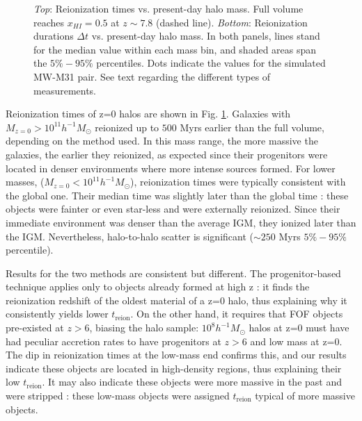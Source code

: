 \documentclass[twocolumn]{aastex61}
\begin{document}
\begin{figure}[ht]
\caption{\textit{Top}: Reionization times vs. present-day halo mass.
Full volume reaches $x_{HI}=0.5$ at $z\sim 7.8$ (dashed line). %
 \textit{Bottom}: Reionization durations $\Delta t$ vs. present-day halo mass. In both panels, lines stand for the median value within each mass bin, and shaded areas span the $5\%-95\%$ percentiles. Dots indicate the values for the simulated MW-M31 pair. See text regarding the different types of measurements.}
\label{fig:treion}
\end{figure}

Reionization times of z=0 halos are shown in Fig. \ref{fig:treion}. Galaxies with $M_{z=0}>10^{11} h^{-1}M_\odot$ reionized up to $500$ Myrs earlier than the full volume, depending on the method used. In this mass range, the more massive the galaxies, the earlier they reionized, as expected since their progenitors were located in denser environments where more intense sources formed. For lower masses, ($M_{z=0}<10^{11} h^{-1}M_\odot$), reionization times were typically consistent with the global one.  Their median time was slightly later than the global time : these objects were fainter or even star-less and were externally reionized. Since their immediate environment was denser than the average IGM, they ionized later than the IGM.  Nevertheless, halo-to-halo scatter is significant ($\sim 250$ Myrs $5\%-95\%$ percentile).

Results for the two methods are consistent but different. The progenitor-based technique applies only to objects already formed at high z : it finds the reionization redshift of the oldest material of a z=0 halo, thus explaining why it consistently yields lower $t_\mathrm{reion}$. On the other hand, it requires that FOF objects pre-existed at $z>6$, biasing the halo sample:  $10^8 h^{-1} M_\odot$ halos at z=0  must have had peculiar accretion rates to have progenitors at $z>6$ and low mass at z=0. The dip in reionization times at the low-mass end confirms this, and our results indicate these objects are located in high-density regions, thus explaining their low $t_\mathrm{reion}$. It may also indicate these objects were more massive in the past and were stripped : these low-mass objects were assigned $t_\mathrm{reion}$ typical of more massive objects.
\end{document}

